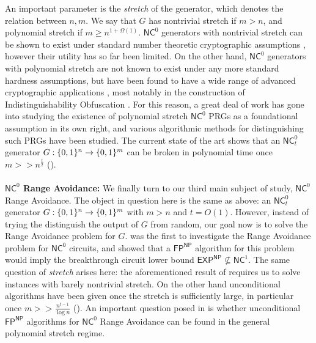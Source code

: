 An important parameter is the \emph{stretch} of the generator, which denotes the relation between $n,m$. We say that $G$ has nontrivial stretch if $m >n$, and polynomial stretch if $m \geq n^{1+\Omega(1)}$. $\mathsf{NC}^0$ generators with nontrivial stretch can be shown to exist under standard number theoretic cryptographic assumptions \cite{randomized-encodings}, however their utility has so far been limited. On the other hand, $\mathsf{NC}^0$ generators with polynomial stretch are not known to exist under any more standard hardness assumptions, but have been found to have a wide range of advanced cryptographic applications \cite{ishai2008cryptography}, most notably in the construction of Indistinguishability Obfuscation \cite{jls1,jls2}. For this reason, a great deal of work has gone into studying the existence of polynomial stretch $\mathsf{NC}^0$ PRGs as a foundational assumption in its own right, and various algorithmic methods for distinguishing such PRGs have been studied. The current state of the art shows that an $\mathsf{NC}_t^0$ generator $G: \{0,1\}^n \to \{0,1\}^m$ can be broken in polynomial time once $m >> n^{\frac{t}{2}}$ (\cite{mossel-epsilon,aow,semirandom}).
~\\~\\
{\bf \noindent $\mathsf{NC}^0$ Range Avoidance:}
We finally turn to our third main subject of study, $\mathsf{NC}^0$ Range Avoidance. The object in question here is the same as above: an $\mathsf{NC}^0_t$ generator $G: \{0,1\}^n \to \{0,1\}^m$ with $m >n$ and $t = O(1)$. However, instead of trying the distinguish the output of $G$ from random, our goal now is to solve the Range Avoidance problem for $G$.
 \cite{RSW} was the first to investigate the Range Avoidance problem for $\mathsf{NC^0}$ circuits, and showed that a $\mathsf{FP^{NP}}$ algorithm for this problem would imply the breakthrough circuit lower bound $\mathsf{EXP^{NP}} \not\subseteq \mathsf{NC}^1$. The same question of \emph{stretch} arises here: the aforementioned result of \cite{RSW} requires us to solve instances with barely nontrivial stretch. On the other hand unconditional algorithms have been given once the stretch is sufficiently large, in particular once $m >> \frac{n^{t-1}}{\log n}$ (\cite{guruswami2022range,karthik}). An important question posed in \cite{RSW} is whether unconditional $\mathsf{FP^{NP}}$ algorithms for $\mathsf{NC}^0$ Range Avoidance can be found in the general polynomial stretch regime.
